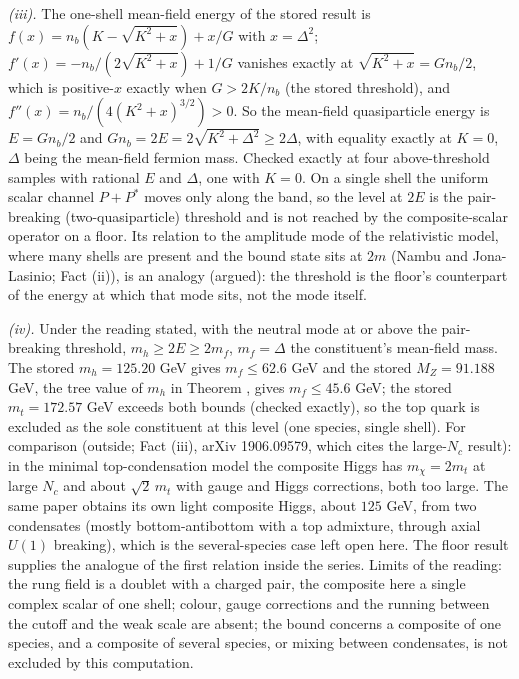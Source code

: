 \emph{(iii).} The one-shell mean-field energy of the stored result is $f(x) = n_{b}(K - \sqrt{K^{2} + x}) + x/G$ with $x = \Delta^{2}$; $f'(x) = -n_{b}/(2\sqrt{K^{2} + x}) + 1/G$ vanishes exactly at $\sqrt{K^{2} + x} = Gn_{b}/2$, which is positive-$x$ exactly when $G > 2K/n_{b}$ (the stored threshold), and $f''(x) = n_{b}/(4(K^{2} + x)^{3/2}) > 0$. So the mean-field quasiparticle energy is $E = Gn_{b}/2$ and $Gn_{b} = 2E = 2\sqrt{K^{2} + \Delta^{2}} \ge 2\Delta$, with equality exactly at $K = 0$, $\Delta$ being the mean-field fermion mass. Checked exactly at four above-threshold samples with rational $E$ and $\Delta$, one with $K = 0$. On a single shell the uniform scalar channel $P + P^{*}$ moves only along the band, so the level at $2E$ is the pair-breaking (two-quasiparticle) threshold and is not reached by the composite-scalar operator on a floor. Its relation to the amplitude mode of the relativistic model, where many shells are present and the bound state sits at $2m$ (Nambu and Jona-Lasinio; Fact (ii)), is an analogy (argued): the threshold is the floor's counterpart of the energy at which that mode sits, not the mode itself.

\emph{(iv).} Under the reading stated, with the neutral mode at or above the pair-breaking threshold, $m_{h} \ge 2E \ge 2m_{f}$, $m_{f} = \Delta$ the constituent's mean-field mass. The stored $m_{h} = 125.20$ GeV gives $m_{f} \le 62.6$ GeV and the stored $M_{Z} = 91.188$ GeV, the tree value of $m_{h}$ in Theorem , gives $m_{f} \le 45.6$ GeV; the stored $m_{t} = 172.57$ GeV exceeds both bounds (checked exactly), so the top quark is excluded as the sole constituent at this level (one species, single shell). For comparison (outside; Fact (iii), arXiv 1906.09579, which cites the large-$N_{c}$ result): in the minimal top-condensation model the composite Higgs has $m_{\chi} = 2m_{t}$ at large $N_{c}$ and about $\sqrt{2}\,m_{t}$ with gauge and Higgs corrections, both too large. The same paper obtains its own light composite Higgs, about $125$ GeV, from two condensates (mostly bottom-antibottom with a top admixture, through axial $U(1)$ breaking), which is the several-species case left open here. The floor result supplies the analogue of the first relation inside the series. Limits of the reading: the rung field is a doublet with a charged pair, the composite here a single complex scalar of one shell; colour, gauge corrections and the running between the cutoff and the weak scale are absent; the bound concerns a composite of one species, and a composite of several species, or mixing between condensates, is not excluded by this computation.
